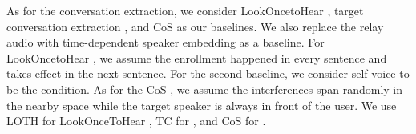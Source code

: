 As for the conversation extraction, we consider LookOncetoHear \cite{veluri2024look}, target conversation extraction \cite{chen2024target}, and CoS \cite{jenrungrot2020cone} as our baselines. We also replace the relay audio with time-dependent speaker embedding as a baseline.
For LookOncetoHear \cite{veluri2024look}, we assume the enrollment happened in every sentence and takes effect in the next sentence. For the second baseline, we consider self-voice to be the condition. As for the CoS \cite{jenrungrot2020cone}, we assume the interferences span randomly in the nearby space while the target speaker is always in front of the user.
We use LOTH for LookOnceToHear \cite{veluri2024look}, TC for \cite{chen2024target}, and CoS for \cite{jenrungrot2020cone}.

